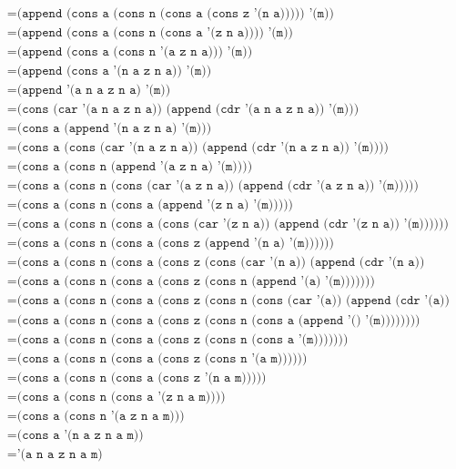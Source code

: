 \documentclass[letterpaper,11pt]{article}
\begin{document}
\begin{enumerate}
\begin{enumerate}
\begin{align*}
            &= \texttt{(append (cons a (cons n (cons a (cons z '(n a))))) '(m))} \\
            &= \texttt{(append (cons a (cons n (cons a '(z n a)))) '(m))} \\
            &= \texttt{(append (cons a (cons n '(a z n a))) '(m))} \\
            &= \texttt{(append (cons a '(n a z n a)) '(m))} \\
            &= \texttt{(append '(a n a z n a) '(m))} \\
            &= \texttt{(cons (car '(a n a z n a)) (append (cdr '(a n a z n a)) '(m)))} \\
            &= \texttt{(cons a (append '(n a z n a) '(m)))} \\
            &= \texttt{(cons a (cons (car '(n a z n a)) (append (cdr '(n a z n a)) '(m))))} \\
            &= \texttt{(cons a (cons n (append '(a z n a) '(m))))} \\
            &= \texttt{(cons a (cons n (cons (car '(a z n a)) (append (cdr '(a z n a)) '(m)))))} \\
            &= \texttt{(cons a (cons n (cons a (append '(z n a) '(m)))))} \\
            &= \texttt{(cons a (cons n (cons a (cons (car '(z n a)) (append (cdr '(z n a)) '(m))))))} \\
            &= \texttt{(cons a (cons n (cons a (cons z (append '(n a) '(m))))))} \\
            &= \texttt{(cons a (cons n (cons a (cons z (cons (car '(n a)) (append (cdr '(n a)) '(m)))))))} \\
            &= \texttt{(cons a (cons n (cons a (cons z (cons n (append '(a) '(m)))))))} \\
            &= \texttt{(cons a (cons n (cons a (cons z (cons n (cons (car '(a)) (append (cdr '(a)) '(m))))))))} \\
            &= \texttt{(cons a (cons n (cons a (cons z (cons n (cons a (append '() '(m))))))))} \\
            &= \texttt{(cons a (cons n (cons a (cons z (cons n (cons a '(m)))))))} \\
            &= \texttt{(cons a (cons n (cons a (cons z (cons n '(a m))))))} \\
            &= \texttt{(cons a (cons n (cons a (cons z '(n a m)))))} \\
            &= \texttt{(cons a (cons n (cons a '(z n a m))))} \\
            &= \texttt{(cons a (cons n '(a z n a m)))} \\
            &= \texttt{(cons a '(n a z n a m))} \\
            &= \texttt{'(a n a z n a m)}
        \end{align*}
    \end{enumerate}


\end{enumerate}
\end{document}
